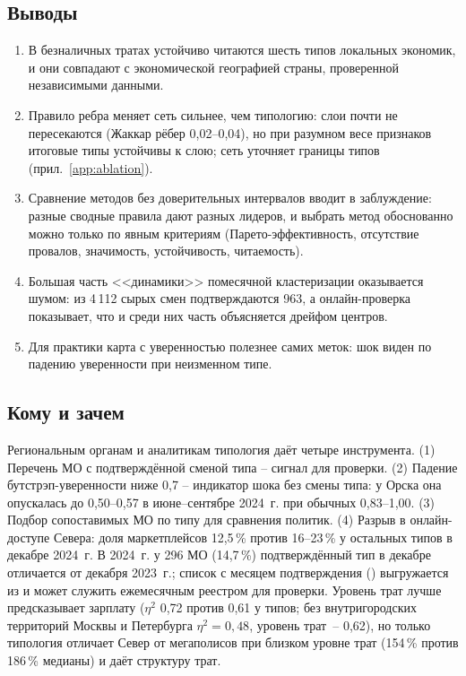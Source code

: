 \documentclass[11pt,a4paper]{article}
\newcommand{\code}[1]{\path{#1}}
\begin{document}
\subsection*{Выводы}
\begin{enumerate}
\item В безналичных тратах устойчиво читаются шесть типов локальных экономик, и они совпадают с экономической географией страны, проверенной независимыми данными.
\item Правило ребра меняет сеть сильнее, чем типологию: слои почти не пересекаются (Жаккар рёбер 0,02--0,04), но при разумном весе признаков итоговые типы устойчивы к слою; сеть уточняет границы типов (прил.~\ref{app:ablation}).
\item Сравнение методов без доверительных интервалов вводит в заблуждение: разные сводные правила дают разных лидеров, и выбрать метод обоснованно можно только по явным критериям (Парето-эффективность, отсутствие провалов, значимость, устойчивость, читаемость).
\item Большая часть <<динамики>> помесячной кластеризации оказывается шумом: из 4\,112 сырых смен подтверждаются 963, а онлайн-проверка показывает, что и среди них часть объясняется дрейфом центров.
\item Для практики карта с уверенностью полезнее самих меток: шок виден по падению уверенности при неизменном типе.
\end{enumerate}

\subsection*{Кому и зачем}
Региональным органам и аналитикам типология даёт четыре инструмента. (1) Перечень МО с подтверждённой сменой типа – сигнал для проверки. (2) Падение бутстрэп-уверенности ниже 0,7 – индикатор шока без смены типа: у Орска она опускалась до 0,50–0,57 в июне–сентябре 2024~г. при обычных 0,83–1,00. (3) Подбор сопоставимых МО по типу для сравнения политик. (4) Разрыв в онлайн-доступе Севера: доля маркетплейсов 12,5\,\% против 16–23\,\% у остальных типов в декабре 2024~г. В 2024~г. у 296 МО (14,7\,\%) подтверждённый тип в декабре отличается от декабря 2023~г.; список с месяцем подтверждения (\code{confirmed_month}) выгружается из \code{outputs/dynamics} и может служить ежемесячным реестром для проверки. Уровень трат лучше предсказывает зарплату ($\eta^2$ 0,72 против 0,61 у типов; без внутригородских территорий Москвы и Петербурга $\eta^2=0{,}48$, уровень трат~-- 0,62), но только типология отличает Север от мегаполисов при близком уровне трат (154\,\% против 186\,\% медианы) и даёт структуру трат.
\end{document}
